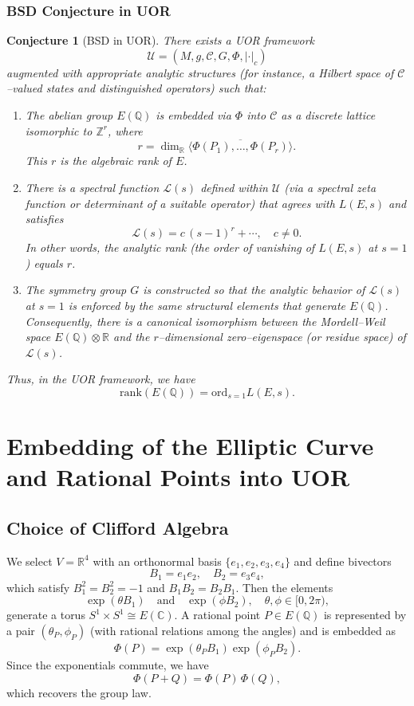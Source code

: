 \documentclass[11pt]{article}
\newtheorem{conj}[thm]{Conjecture}
\begin{document}
\subsubsection*{BSD Conjecture in UOR}
\begin{conj}[BSD in UOR]
There exists a UOR framework 
\[
\mathcal{U}=(M,g,\mathcal{C},G,\Phi,|\cdot|_c)
\]
augmented with appropriate analytic structures (for instance, a Hilbert space of $\mathcal{C}$--valued states and distinguished operators) such that:
\begin{enumerate}[label=(\arabic*)]
  \item The abelian group $E(\mathbb{Q})$ is embedded via $\Phi$ into $\mathcal{C}$ as a discrete lattice isomorphic to $\mathbb{Z}^r$, where
  \[
  r = \dim_{\mathbb{R}}\overline{\langle \Phi(P_1),\dots,\Phi(P_r)\rangle}.
  \]
  This $r$ is the algebraic rank of $E$.
  
  \item There is a spectral function $\mathcal{L}(s)$ defined within $\mathcal{U}$ (via a spectral zeta function or determinant of a suitable operator) that agrees with $L(E,s)$ and satisfies
  \[
  \mathcal{L}(s) = c\,(s-1)^r + \cdots,\quad c\neq 0.
  \]
  In other words, the \emph{analytic rank} (the order of vanishing of $L(E,s)$ at $s=1$) equals $r$.
  
  \item The symmetry group $G$ is constructed so that the analytic behavior of $\mathcal{L}(s)$ at $s=1$ is enforced by the same structural elements that generate $E(\mathbb{Q})$. Consequently, there is a canonical isomorphism between the Mordell--Weil space $E(\mathbb{Q})\otimes \mathbb{R}$ and the $r$--dimensional zero--eigenspace (or residue space) of $\mathcal{L}(s)$.
\end{enumerate}
Thus, in the UOR framework, we have
\[
\mathrm{rank}(E(\mathbb{Q})) = \mathrm{ord}_{s=1} L(E,s).
\]
\end{conj}

\section{Embedding of the Elliptic Curve and Rational Points into UOR}

\subsection{Choice of Clifford Algebra}
We select $V = \mathbb{R}^4$ with an orthonormal basis $\{e_1,e_2,e_3,e_4\}$ and define bivectors
\[
B_1 = e_1 e_2,\quad B_2 = e_3 e_4,
\]
which satisfy $B_1^2 = B_2^2 = -1$ and $B_1 B_2 = B_2 B_1$. Then the elements
\[
\exp(\theta B_1) \quad \text{and} \quad \exp(\phi B_2),\quad \theta,\phi \in [0,2\pi),
\]
generate a torus $S^1 \times S^1 \cong E(\mathbb{C})$. A rational point $P \in E(\mathbb{Q})$ is represented by a pair $(\theta_P,\phi_P)$ (with rational relations among the angles) and is embedded as
\[
\Phi(P)=\exp(\theta_P B_1)\exp(\phi_P B_2).
\]
Since the exponentials commute, we have
\[
\Phi(P+Q) = \Phi(P)\,\Phi(Q),
\]
which recovers the group law.
\end{document}
